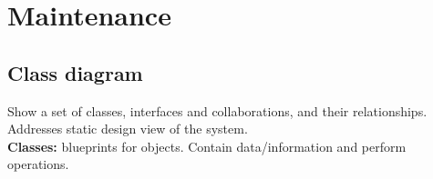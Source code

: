 \documentclass{article}
\begin{document}
\section{Maintenance}

\subsection{Class diagram}
\begin{flushleft}
	Show a set of classes, interfaces and collaborations, and their relationships. Addresses static design view of the system.\\
	\textbf{Classes:} blueprints for objects. Contain data/information and perform operations.
\end{flushleft}
\end{document}
